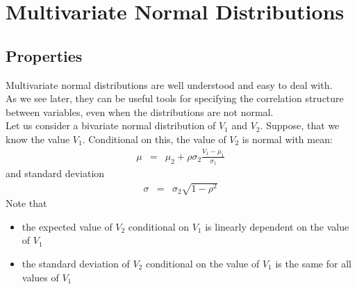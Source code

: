 \chapter{Multivariate Normal Distributions}

\section{Properties}
Multivariate normal distributions are well understood and easy to deal with.\\
As we see later, they can be useful tools for specifying the correlation structure between variables, even when the distributions are not normal.\\
Let us consider a bivariate normal distribution of $V_{1}$ and $V_{2}$. Suppose, that we know the value $V_{1}$. Conditional on this, the value of $V_{2}$ is normal with mean:
\begin{eqnarray}
	\mu &=& \mu_{2} + \rho\sigma_{2}\frac{V_{1} - \mu_{1}}{\sigma_{1}}
\end{eqnarray}
and standard deviation
\begin{eqnarray}
	\sigma &=& \sigma_{2}\sqrt{1 - \rho^{2}}
\end{eqnarray}
Note that
\begin{itemize}
	\item the expected value of $V_{2}$ conditional on $V_{1}$ is linearly dependent on the value of $V_{1}$
	\item the standard deviation of $V_{2}$ conditional on the value of $V_{1}$ is the same for all values of $V_{1}$
\end{itemize}

